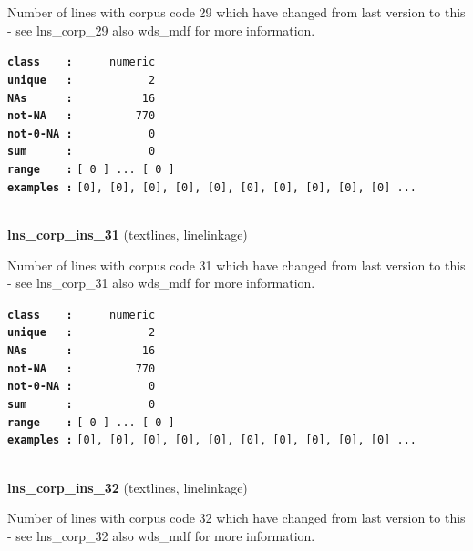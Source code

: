 \documentclass[]{article}
\begin{document}
Number of lines with corpus code 29 which have changed from last version
to this - see lns\_corp\_29 also wds\_mdf for more information.

\textbf{\texttt{class\ \ \ \ :}} \texttt{~~~~~numeric}\\
\textbf{\texttt{unique\ \ \ :}} \texttt{~~~~~~~~~~~2}\\
\textbf{\texttt{NAs\ \ \ \ \ \ :}} \texttt{~~~~~~~~~~16}\\
\textbf{\texttt{not-NA\ \ \ :}} \texttt{~~~~~~~~~770}\\
\textbf{\texttt{not-0-NA\ :}} \texttt{~~~~~~~~~~~0}\\
\textbf{\texttt{sum\ \ \ \ \ \ :}} \texttt{~~~~~~~~~~~0}\\
\textbf{\texttt{range\ \ \ \ :}}
\texttt{{[}\ 0\ {]}\ ...\ {[}\ 0\ {]}}\\
\textbf{\texttt{examples\ :}}
\texttt{{[}0{]},\ {[}0{]},\ {[}0{]},\ {[}0{]},\ {[}0{]},\ {[}0{]},\ {[}0{]},\ {[}0{]},\ {[}0{]},\ {[}0{]}\ ...}\\

~

\textbf{lns\_corp\_ins\_31} (textlines, linelinkage)

Number of lines with corpus code 31 which have changed from last version
to this - see lns\_corp\_31 also wds\_mdf for more information.

\textbf{\texttt{class\ \ \ \ :}} \texttt{~~~~~numeric}\\
\textbf{\texttt{unique\ \ \ :}} \texttt{~~~~~~~~~~~2}\\
\textbf{\texttt{NAs\ \ \ \ \ \ :}} \texttt{~~~~~~~~~~16}\\
\textbf{\texttt{not-NA\ \ \ :}} \texttt{~~~~~~~~~770}\\
\textbf{\texttt{not-0-NA\ :}} \texttt{~~~~~~~~~~~0}\\
\textbf{\texttt{sum\ \ \ \ \ \ :}} \texttt{~~~~~~~~~~~0}\\
\textbf{\texttt{range\ \ \ \ :}}
\texttt{{[}\ 0\ {]}\ ...\ {[}\ 0\ {]}}\\
\textbf{\texttt{examples\ :}}
\texttt{{[}0{]},\ {[}0{]},\ {[}0{]},\ {[}0{]},\ {[}0{]},\ {[}0{]},\ {[}0{]},\ {[}0{]},\ {[}0{]},\ {[}0{]}\ ...}\\

~

\textbf{lns\_corp\_ins\_32} (textlines, linelinkage)

Number of lines with corpus code 32 which have changed from last version
to this - see lns\_corp\_32 also wds\_mdf for more information.
\end{document}

